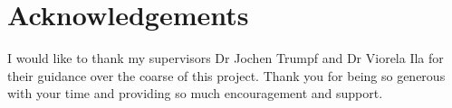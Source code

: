 \chapter*{Acknowledgements}

I would like to thank my supervisors Dr Jochen Trumpf and Dr Viorela Ila for their guidance over the coarse of this project. Thank you for being so generous with your time and providing so much encouragement and support.

